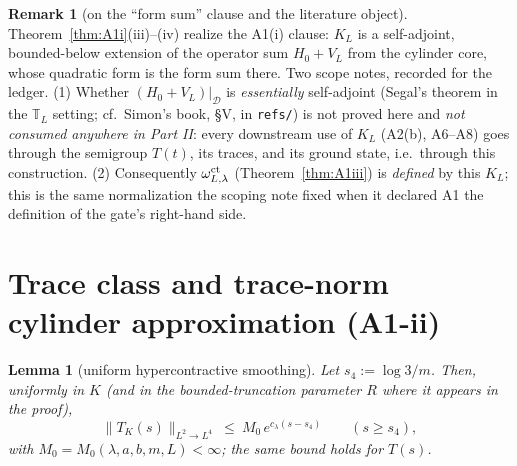 \documentclass[11pt,a4paper]{article}
\theoremstyle{plain}
\newtheorem{lemma}[theorem]{Lemma}
\theoremstyle{definition}
\newtheorem{remark}[theorem]{Remark}
\newcommand{\T}{\mathbb{T}}
\newcommand{\D}{\mathcal D}
\begin{document}
\begin{remark}[on the ``form sum'' clause and the literature
object]\label{rem:formsum}
Theorem~\ref{thm:A1i}(iii)--(iv) realize the A1(i) clause: $K_L$ is a
self-adjoint, bounded-below extension of the operator sum
$H_0+V_L$ from the cylinder core, whose quadratic form is the form sum
there. Two scope notes, recorded for the ledger. (1) Whether
$(H_0+V_L)|_\D$ is \emph{essentially} self-adjoint (Segal's theorem in
the $\T_L$ setting; cf.\ Simon's book, \S V, in \texttt{refs/}) is not
proved here and \emph{not consumed anywhere in Part II}: every
downstream use of $K_L$ (A2(b), A6--A8) goes through the semigroup
$T(t)$, its traces, and its ground state, i.e.\ through this
construction. (2) Consequently $\omega^{\rm ct}_{L,\lambda}$
(Theorem~\ref{thm:A1iii}) is \emph{defined} by this $K_L$; this is the
same normalization the scoping note fixed when it declared A1 the
definition of the gate's right-hand side.
\end{remark}

\section{Trace class and trace-norm cylinder approximation
(A1-ii)}\label{sec:trace}

\begin{lemma}[uniform hypercontractive smoothing]\label{lem:ladder}
Let $s_4:=\log3/m$. Then, uniformly in $K$ (and in the bounded-truncation
parameter $R$ where it appears in the proof),
\[
 \|T_K(s)\|_{L^2\to L^4}\ \le\ M_0\,e^{c_\lambda(s-s_4)}
 \qquad(s\ge s_4),
\]
with $M_0=M_0(\lambda,a,b,m,L)<\infty$; the same bound holds for
$T(s)$.
\end{lemma}
\end{document}
